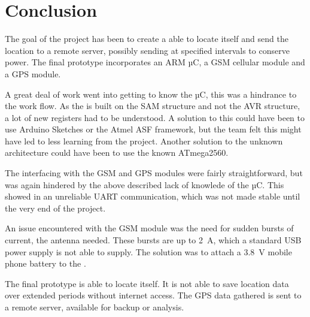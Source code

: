 
\chapter{Conclusion}
\label{chap:conclusion}
The goal of the project has been to create a \systemName able to locate itself and send the location to a remote server, possibly sending at specified intervals to conserve power.
The final prototype incorporates an ARM µC, a GSM cellular module and a GPS module.

A great deal of work went into getting to know the \SAMD µC, this was a hindrance to the work flow.
As the \SAMD is built on the SAM structure and not the AVR structure, a lot of new registers had to be understood.
A solution to this could have been to use Arduino Sketches or the Atmel ASF framework, but the team felt this might have led to less learning from the project.
Another solution to the unknown architecture could have been to use the known ATmega2560.

The interfacing with the GSM and GPS modules were fairly straightforward, but was again hindered by the above described lack of knowlede of the \SAMD µC.
This showed in an unreliable UART communication, which was not made stable until the very end of the project.

An issue encountered with the GSM module was the need for sudden bursts of current, the antenna needed.
These bursts are up to \SI{2}{\ampere}, which a standard USB power supply is not able to supply.
The solution was to attach a \SI{3.8}{\volt} mobile phone battery to the \MKR.

The final prototype is able to locate itself.
It is not able to save location data over extended periods without internet access.
The GPS data gathered is sent to a remote server, available for backup or analysis.

\FloatBarrier